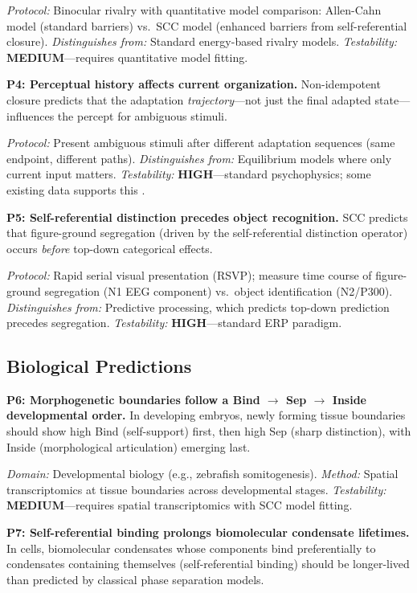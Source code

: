 \documentclass[lettersize,journal]{IEEEtran}
\begin{document}
\emph{Protocol:} Binocular rivalry with quantitative model comparison: Allen-Cahn model (standard barriers) vs.\ SCC model (enhanced barriers from self-referential closure). \emph{Distinguishes from:} Standard energy-based rivalry models. \emph{Testability:} \textbf{MEDIUM}---requires quantitative model fitting.

\textbf{P4: Perceptual history affects current organization.} Non-idempotent closure predicts that the adaptation \emph{trajectory}---not just the final adapted state---influences the percept for ambiguous stimuli.

\emph{Protocol:} Present ambiguous stimuli after different adaptation sequences (same endpoint, different paths). \emph{Distinguishes from:} Equilibrium models where only current input matters. \emph{Testability:} \textbf{HIGH}---standard psychophysics; some existing data supports this \cite{leopold2002stable}.

\textbf{P5: Self-referential distinction precedes object recognition.} SCC predicts that figure-ground segregation (driven by the self-referential distinction operator) occurs \emph{before} top-down categorical effects.

\emph{Protocol:} Rapid serial visual presentation (RSVP); measure time course of figure-ground segregation (N1 EEG component) vs.\ object identification (N2/P300). \emph{Distinguishes from:} Predictive processing, which predicts top-down prediction precedes segregation. \emph{Testability:} \textbf{HIGH}---standard ERP paradigm.

\subsection{Biological Predictions}

\textbf{P6: Morphogenetic boundaries follow a Bind $\to$ Sep $\to$ Inside developmental order.} In developing embryos, newly forming tissue boundaries should show high Bind (self-support) first, then high Sep (sharp distinction), with Inside (morphological articulation) emerging last.

\emph{Domain:} Developmental biology (e.g., zebrafish somitogenesis). \emph{Method:} Spatial transcriptomics at tissue boundaries across developmental stages. \emph{Testability:} \textbf{MEDIUM}---requires spatial transcriptomics with SCC model fitting.

\textbf{P7: Self-referential binding prolongs biomolecular condensate lifetimes.} In cells, biomolecular condensates whose components bind preferentially to condensates containing themselves (self-referential binding) should be longer-lived than predicted by classical phase separation models.
\end{document}
